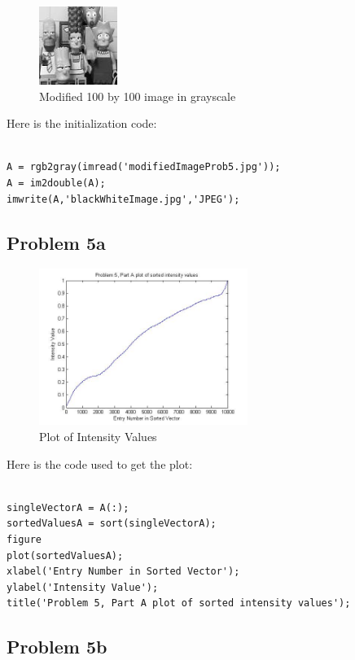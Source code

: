 \documentclass[11pt,psfig]{article}
\begin{document}
\begin{figure}[H]
\centering
\includegraphics[height=1in]{blackWhiteImage.jpg}
\caption{Modified 100 by 100 image in grayscale}
\end{figure}

Here is the initialization code:

\begin{verbatim}

A = rgb2gray(imread('modifiedImageProb5.jpg'));
A = im2double(A);
imwrite(A,'blackWhiteImage.jpg','JPEG');

\end{verbatim}

\subsection*{Problem 5a}

\begin{figure}[H]
\centering
\includegraphics[height=2in]{prob5partAplot.jpg}
\caption{Plot of Intensity Values}
\end{figure}

Here is the code used to get the plot:

\begin{verbatim}

singleVectorA = A(:);
sortedValuesA = sort(singleVectorA);
figure
plot(sortedValuesA);
xlabel('Entry Number in Sorted Vector');
ylabel('Intensity Value');
title('Problem 5, Part A plot of sorted intensity values');

\end{verbatim}

\subsection*{Problem 5b}
\end{document}
